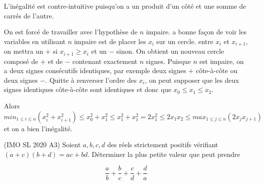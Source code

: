 \begin{sol}
L'inégalité est contre-intuitive puisqu'on a un produit d'un côté et une somme de carrés de l'autre. 

On est forcé de travailler avec l'hypothèse de $n$ impaire. a bonne façon de voir les variables en utilisant $n$ impaire est de placer les $x_i$ sur un cercle. entre $x_i$ et $x_{i+1}$, on mettra un $+$ si $x_{i+1}\geq x_i$ et un $-$ sinon. On obtient un nouveau cercle composé de $+$ et de $-$ contenant exactement $n$ signes. Puisque $n$ est impaire, on a deux signes consécutifs identiques, par exemple deux signes $+$ côte-à-côte ou deux signes $-$. Quitte à renverser l'ordre des $x_i$, on peut supposer que les deux signes identiques côte-à-côte sont identiques et donc que $x_0\leq x_1\leq x_2$. 

Alors $$min _{1\leq i\leq n} (x_i^2+x_{i+1}^2)\leq x_0^2+x_1^2\leq x_1^2+x_1^2=2x_1^2\leq 2x_1x_2\leq max_{1\leq j\leq n}(2x_jx_{j+1})$$ et on a bien l'inégalité. 
\end{sol}


\begin{exo}
(IMO SL 2020 A3)
Soient $a,b,c,d$ des réels strictement positifs vérifiant $(a+c)(b+d)=ac+bd$. Déterminer la plus petite valeur que peut prendre 

\[\frac{a}{b}+\frac{b}{c}+\frac{c}{d}+\frac{d}{a}\]
\end{exo}

